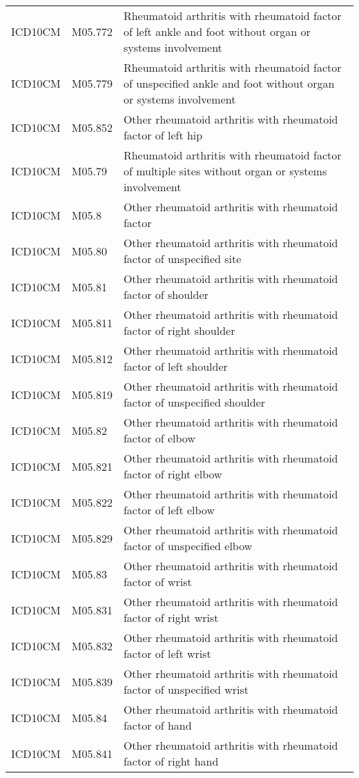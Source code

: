 \begin{longtable}{p{}p{}p{}}
  ICD10CM & M05.772 & Rheumatoid arthritis with rheumatoid factor of left ankle and foot without organ or systems involvement \\ 
  ICD10CM & M05.779 & Rheumatoid arthritis with rheumatoid factor of unspecified ankle and foot without organ or systems involvement \\ 
  ICD10CM & M05.852 & Other rheumatoid arthritis with rheumatoid factor of left hip \\ 
  ICD10CM & M05.79 & Rheumatoid arthritis with rheumatoid factor of multiple sites without organ or systems involvement \\ 
  ICD10CM & M05.8 & Other rheumatoid arthritis with rheumatoid factor \\ 
  ICD10CM & M05.80 & Other rheumatoid arthritis with rheumatoid factor of unspecified site \\ 
  ICD10CM & M05.81 & Other rheumatoid arthritis with rheumatoid factor of shoulder \\ 
  ICD10CM & M05.811 & Other rheumatoid arthritis with rheumatoid factor of right shoulder \\ 
  ICD10CM & M05.812 & Other rheumatoid arthritis with rheumatoid factor of left shoulder \\ 
  ICD10CM & M05.819 & Other rheumatoid arthritis with rheumatoid factor of unspecified shoulder \\ 
  ICD10CM & M05.82 & Other rheumatoid arthritis with rheumatoid factor of elbow \\ 
  ICD10CM & M05.821 & Other rheumatoid arthritis with rheumatoid factor of right elbow \\ 
  ICD10CM & M05.822 & Other rheumatoid arthritis with rheumatoid factor of left elbow \\ 
  ICD10CM & M05.829 & Other rheumatoid arthritis with rheumatoid factor of unspecified elbow \\ 
  ICD10CM & M05.83 & Other rheumatoid arthritis with rheumatoid factor of wrist \\ 
  ICD10CM & M05.831 & Other rheumatoid arthritis with rheumatoid factor of right wrist \\ 
  ICD10CM & M05.832 & Other rheumatoid arthritis with rheumatoid factor of left wrist \\ 
  ICD10CM & M05.839 & Other rheumatoid arthritis with rheumatoid factor of unspecified wrist \\ 
  ICD10CM & M05.84 & Other rheumatoid arthritis with rheumatoid factor of hand \\ 
  ICD10CM & M05.841 & Other rheumatoid arthritis with rheumatoid factor of right hand \\ 

\end{longtable}
